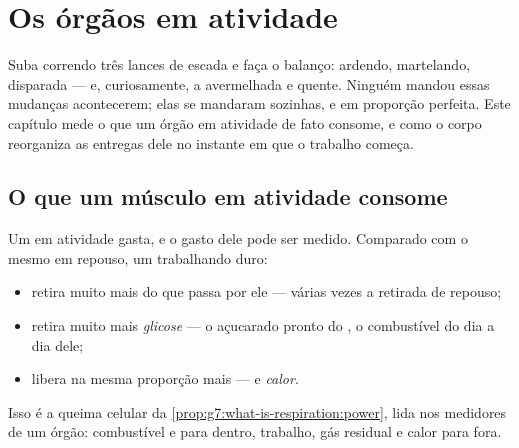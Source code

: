 \chapter{Os órgãos em atividade}\label{ch:g7:organs-at-work}

Suba correndo três lances de escada e faça o balanço:  ardendo,
 martelando,  disparada --- e, curiosamente, a 
avermelhada e quente. Ninguém mandou essas mudanças acontecerem; elas
se mandaram sozinhas, e em proporção perfeita. Este capítulo mede o
que um órgão em atividade de fato consome, e como o corpo reorganiza
as entregas dele no instante em que o trabalho começa.

\section{O que um músculo em atividade consome}

\begin{proposition}\label{prop:g7:organs-at-work:bill}
Um  em atividade gasta, e o gasto dele pode ser medido.
Comparado com o mesmo  em repouso, um  trabalhando duro:
\begin{itemize}
  \item retira muito mais \emph{} do  que passa por ele
        --- várias vezes a retirada de repouso;
  \item retira muito mais \emph{glicose} --- o
         açucarado pronto do , o combustível do dia a
        dia dele;
  \item libera na mesma proporção mais \emph{} --- e
        \emph{calor}.
\end{itemize}
Isso é a queima celular da \cref{prop:g7:what-is-respiration:power},
lida nos medidores de um órgão: combustível e  para dentro,
trabalho, gás residual e calor para fora.
\end{proposition}
\admitted

